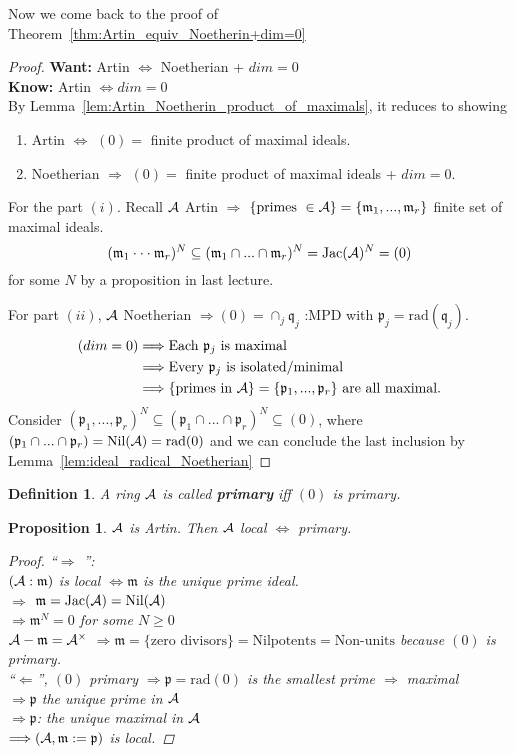\documentclass[11pt]{article}
\newtheorem{prop}[thm]{Proposition}
\newtheorem{dfn}[thm]{Definition}
\newcommand{\scm}{{\mathfrak m}}
\newcommand{\scp}{{\mathfrak p}}
\newcommand{\scq}{\mathfrak q}
\newcommand{\cala}{{\cal A}}
\newcommand{\Lrta}{\Longrightarrow}
\newcommand{\Llta}{\Longleftarrow}
\newcommand{\Llrta}{\Longleftrightarrow}
\begin{document}
Now we come back to the proof of Theorem~\ref{thm:Artin_equiv_Noetherin+dim=0}
\begin{proof}
\textbf{Want:} Artin $\Llrta $ Noetherian + $dim=0$\\
\textbf{Know:} Artin $\Llrta dim=0$\\
By Lemma~\ref{lem:Artin_Noetherin_product_of_maximals}, it reduces to showing 
\begin{enumerate}[label=(\roman*)]
\item Artin $\Llrta $ $(0)=$ finite product of maximal ideals.
\item Noetherian $\Lrta $ $(0)=$ finite product of maximal ideals + $dim=0$.
\end{enumerate}

For the part $(i)$. Recall $\cala$ Artin $\Lrta $ $\{\text{primes }\in \cala\}=\{\scm_1,...,\scm_r\}$ finite set of maximal ideals.
$$
(\scm_1\cdot \cdot \cdot \scm_r)^N\subseteq (\scm_1\cap ...\cap \scm_r)^N=\text{Jac}(\cala)^N=(0)
$$
for some $N$ by a proposition in last lecture.

For part $(ii)$, $\cala$ Noetherian $\Lrta (0)=\cap_j\scq_j$ :MPD with $\scp_j=\text{rad}(\scq_j)$.
$$
\begin{aligned}
(dim=0)& \Lrta\text{Each $\scp_j$ is maximal}\\
& \Lrta \text{Every $\scp_j$ is isolated/minimal}\\
& \Lrta \text{\{primes in $\cala$\}}=\{\scp_1,...,\scp_r\} \text{ are all maximal.}
\end{aligned}
$$
Consider $(\scp_1,...,\scp_r)^N\subseteq (\scp_1\cap...\cap\scp_r)^N\subseteq (0)$, where $(\scp_1\cap...\cap \scp_r)=\text{Nil}(  \cala)=\text{rad}(0)$ and we can conclude the last inclusion by Lemma~\ref{lem:ideal_radical_Noetherian}
\end{proof}
\begin{dfn}
A ring $\cala$ is called \textbf{primary} iff $(0)$ is primary.
\end{dfn}

\begin{prop}
$\cala$ is Artin. Then $\cala$ local $\Llrta $ primary.
\begin{proof}
``$\Lrta$ '':\\
$(\cala:\scm)$ is local $\Llrta \scm $ is the unique prime ideal.\\
$\Lrta$ $\scm=\text{Jac}(\cala)=\text{Nil}(  \cala)$\\
$\Lrta\scm^N=0$ for some $N\geq 0$\\
$\cala-\scm=\cala^\times$
$\Lrta\scm=\{\text{zero divisors}\}=\text{Nilpotents}=\text{Non-units}$ because $(0)$ is primary.\\
``$\Llta$'', $(0)$ primary $\Lrta \scp=\text{rad}(0)$ is the smallest prime $\Lrta$ maximal\\
$\Lrta\scp$ the unique prime in $\cala$\\
$\Lrta\scp$: the unique maximal in $\cala$\\
$\Lrta(\cala,\scm:=\scp)$ is local.

\end{proof}
\end{prop}
\end{document}
